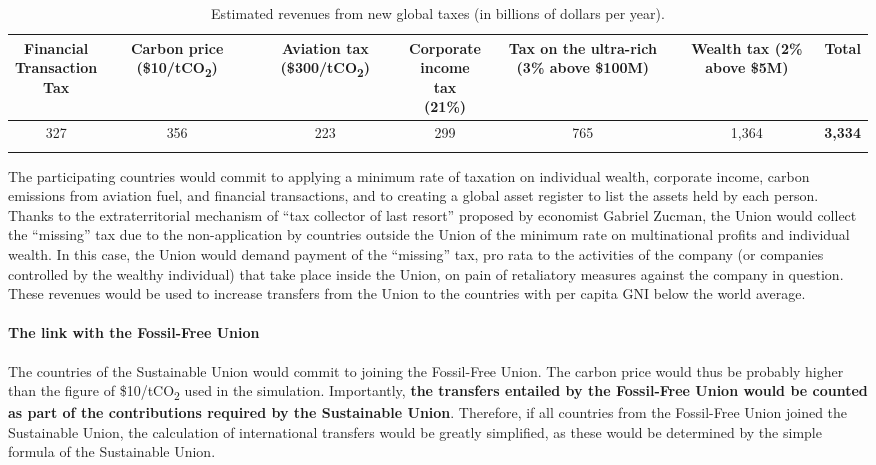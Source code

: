 \documentclass[12pt,english]{article}
\newcommand{\bo}[1]{\textbf{#1}}
\begin{document}
\begin{table}[h!]
  \centering 
  \caption{Estimated revenues from new global taxes (in billions of dollars per year).\label{tab:su}}
  \begin{tabular}[t]{ccccccc}
  \toprule
  \makecell{Financial\\Transaction\\Tax} & \makecell{Carbon\\price\\(\$10/tCO\textsubscript{2})} & \makecell{Aviation\\tax\\(\$300/tCO\textsubscript{2})} & \makecell{Corporate\\income tax\\(21\%)} & \makecell{Tax on the\\ultra-rich\\(3\% above\\ \$100M)} & \makecell{Wealth tax\\(2\% above\\ \$5M)} & \bo{Total} \\
  \midrule
  327 & 356 & 223 & 299 & 765 & 1,364 & \bo{3,334} \\
  \bottomrule\\[-0.81em]
  \end{tabular}
\end{table}

The participating countries would commit to applying a minimum rate of taxation on individual wealth, corporate income, carbon emissions from aviation fuel, and financial transactions, and to creating a global asset register to list the assets held by each person. 
Thanks to the extraterritorial mechanism of ``tax collector of last resort'' proposed by economist Gabriel Zucman,\cite{zucman_blueprint_2024} the Union would collect the ``missing'' tax due to the non-application by countries outside the Union of the minimum rate on multinational profits and individual wealth. In this case, the Union would demand payment of the ``missing'' tax, pro rata to the activities of the company (or companies controlled by the wealthy individual) that take place inside the Union, on pain of retaliatory measures against the company in question. These revenues would be used to increase transfers from the Union to the countries with per capita GNI below the world average. 

\paragraph{The link with the Fossil-Free Union}
The countries of the Sustainable Union would commit to joining the Fossil-Free Union. The carbon price would thus be probably higher than the figure of \$10/tCO\textsubscript{2} used in the simulation. Importantly, \textbf{the transfers entailed by the Fossil-Free Union would be counted as part of the contributions required by the Sustainable Union}. Therefore, if all countries from the Fossil-Free Union joined the Sustainable Union, the calculation of international transfers would be greatly simplified, as these would be determined by the simple formula of the Sustainable Union. 
\end{document}
